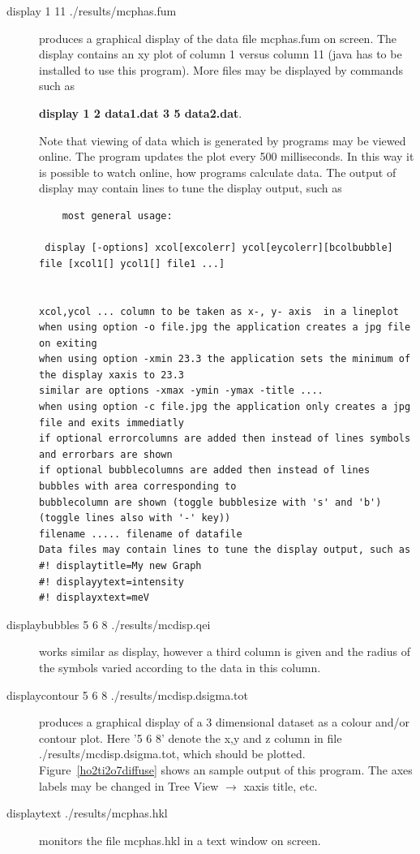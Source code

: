\begin{description} 
\item [display 1 11 ./results/mcphas.fum] produces a graphical display of the data %
file
mcphas.fum on screen. The display contains an xy plot of column 1 versus column 11
({\prg java} has to be installed to use this program). 
More files may be displayed by commands such as

{\bf display 1 2 data1.dat 3 5 data2.dat}.

Note that viewing of 
data which is generated by programs may be viewed online. The program updates the plot
every 500 milliseconds. In this way it is possible to watch online, how programs
calculate data. The output of display may contain lines to tune the display output, %
such as
\begin{verbatim}
	most general usage: 

 display [-options] xcol[excolerr] ycol[eycolerr][bcolbubble] file [xcol1[] ycol1[] file1 ...]


xcol,ycol ... column to be taken as x-, y- axis  in a lineplot
when using option -o file.jpg the application creates a jpg file on exiting
when using option -xmin 23.3 the application sets the minimum of the display xaxis to 23.3
similar are options -xmax -ymin -ymax -title ....
when using option -c file.jpg the application only creates a jpg file and exits immediatly
if optional errorcolumns are added then instead of lines symbols and errorbars are shown
if optional bubblecolumns are added then instead of lines bubbles with area corresponding to
bubblecolumn are shown (toggle bubblesize with 's' and 'b')
(toggle lines also with '-' key))
filename ..... filename of datafile
Data files may contain lines to tune the display output, such as
#! displaytitle=My new Graph
#! displayytext=intensity
#! displayxtext=meV 
\end{verbatim} 

\item [displaybubbles  5 6 8 ./results/mcdisp.qei] works similar as display, however
a third column is given and the radius of the symbols varied according to the data in 
this column.

\item [displaycontour 5 6 8 ./results/mcdisp.dsigma.tot] produces a graphical
display of a 3 dimensional dataset as a colour and/or contour plot. Here '5 6 8' 
denote the x,y and z column in file {\prg ./results/mcdisp.dsigma.tot}, which should
be plotted. Figure~\ref{ho2ti2o7diffuse} shows an sample output of this program. The axes labels may be changed
in Tree View $\rightarrow$ xaxis title, etc.

\item [displaytext ./results/mcphas.hkl] monitors the file mcphas.hkl in a text window
on screen.
\end{description} 

